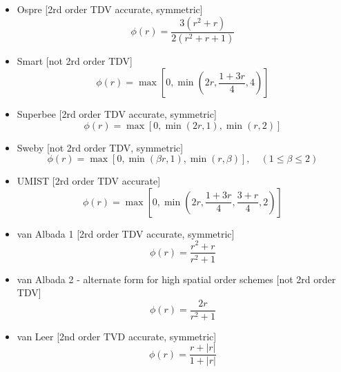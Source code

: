 \begin{itemize}
		\item Ospre [2rd order TDV accurate, symmetric] \cite{Waterson95}
			\begin{equation}
				\phi\left(r\right)=\frac{3\left(r^2+r\right)}{2\left(r^2+r+1\right)}
			\end{equation}
			
		\item Smart [not 2rd order TDV] \cite{Gaskell88}
			\begin{equation}
				\phi\left(r\right)=\max\left[0,\min\left(2r,\frac{1+3r}{4},4\right)\right]
			\end{equation}
			
		\item Superbee [2rd order TDV accurate, symmetric] \cite{Roe86}
			\begin{equation}
				\phi\left(r\right)=\max\left[0,\min\left(2r,1\right),\min\left(r,2\right)\right]
			\end{equation}
			
		\item Sweby [not 2rd order TDV, symmetric] \cite{Sweby84}
			\begin{equation}
				\phi\left(r\right)=\max\left[0,\min\left(\beta r,1\right),\min\left(r,\beta\right)\right], \quad\left(1\leq\beta\leq2\right)
			\end{equation}
			
		\item UMIST [2rd order TDV accurate] \cite{Lien94}
			\begin{equation}
				\phi\left(r\right)=\max\left[0,\min\left(2r,\frac{1+3r}{4},\frac{3+r}{4},2\right)\right]
			\end{equation}
			
			\newpage
			
		\item van Albada 1 [2rd order TDV accurate, symmetric] \cite{VanAlbada82}
			\begin{equation}
				\phi\left(r\right)=\frac{r^2+r}{r^2+1}
			\end{equation}
			
		\item van Albada 2 - alternate form for high spatial order schemes [not 2rd order TDV] \cite{Kermani03}
			\begin{equation}
				\phi\left(r\right)=\frac{2r}{r^2+1}
			\end{equation}
			
		\item van Leer [2nd order TVD accurate, symmetric] \cite{VanLeer74}
			\begin{equation}
				\phi\left(r\right)=\frac{r+\left|r\right|}{1+\left|r\right|}
			\end{equation}
	
	\end{itemize}
	
